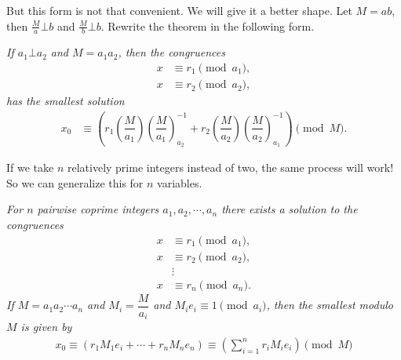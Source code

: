\documentclass{subfile}
\begin{document}
	But this form is not that convenient. We will give it a better shape. Let $M=ab$, then $\frac{M}{a}\bot b$ and $\frac{M}{b}\bot b$. Rewrite the theorem in the following form.
		\begin{theorem}\slshape
			If $a_1\bot a_2$ and $M=a_1a_2$, then the congruences	
			\begin{align*}
			x & \equiv r_1\pmod{a_1},\\
			x & \equiv r_2\pmod{a_2},
			\end{align*}
			has the smallest solution
			\begin{align*}
			x_0 & \equiv 
			\left(r_1\left(\dfrac{M}{a_1}\right)\left(\dfrac{M}{a_1}\right)^{-1}_{a_2}+r_2\left(\dfrac{M}{a_2}\right)\left(\dfrac{M}{a_2}\right)^{-1}_{a_1}\right)\pmod{M}.
			\end{align*}
		\end{theorem}
	If we take $n$ relatively prime integers instead of two, the same process will work! So we can generalize this for $n$ variables.
		\begin{theorem}[CRT]\slshape
			For $n$ pairwise coprime integers $a_1,a_2,\cdots,a_n$ there exists a solution to the congruences
				\begin{align*}
					x & \equiv r_1\pmod{a_1},\\
					x & \equiv r_2\pmod{a_2},\\
					   &\vdots\\
					x & \equiv r_n\pmod{a_n}.
				\end{align*}
			If $M=a_1a_2\cdots a_n$ and $M_i=\dfrac{M}{a_i}$ and $M_ie_i\equiv1\pmod{a_i}$, then the smallest  modulo $M$ is given by
			\begin{align*}
			x_0  \equiv \left(r_1 M_1e_i+\cdots+r_n M_ne_n\right)\equiv \left(\sum_{i=1}^{n} r_i M_ie_i\right)\pmod M
			\end{align*}
		\end{theorem}
	
\end{document}
